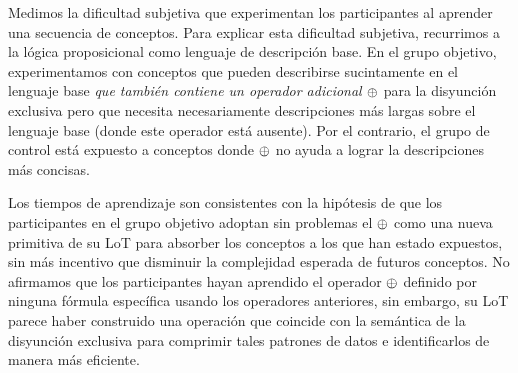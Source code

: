 Medimos la dificultad subjetiva que experimentan los participantes al aprender una secuencia de conceptos. Para explicar esta dificultad subjetiva, recurrimos a la lógica proposicional como lenguaje de descripción base. En el grupo objetivo, experimentamos con conceptos que pueden describirse sucintamente en el lenguaje base {\em que también contiene un operador adicional $ \oplus $} para la disyunción exclusiva pero que necesita necesariamente descripciones más largas sobre el lenguaje base (donde este operador está ausente). Por el contrario, el grupo de control está expuesto a conceptos donde $ \oplus $ no ayuda a lograr la descripciones más concisas.

Los tiempos de aprendizaje son consistentes con la hipótesis de que los participantes en el grupo objetivo adoptan sin problemas el $ \oplus $ como una nueva primitiva de su LoT para absorber los conceptos a los que han estado expuestos, sin más incentivo que disminuir la complejidad esperada de futuros conceptos. No afirmamos que los participantes hayan aprendido el operador $ \oplus $ definido por ninguna fórmula específica usando los operadores anteriores, sin embargo, su LoT parece haber construido una operación que coincide con la semántica de la disyunción exclusiva para comprimir tales patrones de datos e identificarlos de manera más eficiente.


